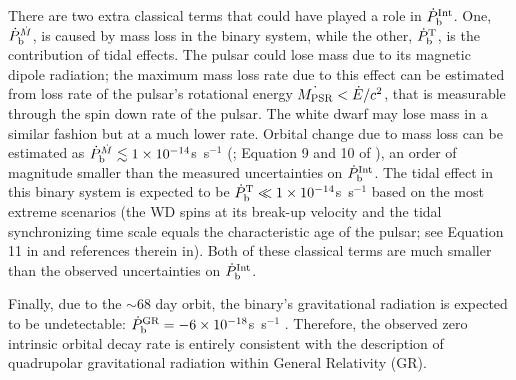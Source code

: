 There are two extra classical terms that could have played a role in
$\dot{P}_{\rm b}^{\rm Int}$. One, $\dot{P}_{\rm b}^{\dot{M}}$, is caused by mass loss in the
binary system, while the other, $\dot{P}_{\rm b}^{\rm T}$, is the contribution of tidal effects.
The pulsar could lose mass due to its magnetic dipole radiation; the maximum
mass loss rate due to this effect can be estimated from loss rate of the
pulsar's rotational energy $\dot{M_{\rm PSR}}<\dot{E}/c^2$, that is
measurable through the spin down rate of the pulsar.
The white dwarf may lose mass in a similar fashion but at a much lower rate.
Orbital change due to mass loss can be estimated as $\dot{P}_{\rm
b}^{\dot{M}}\lesssim 1\times10^{-14}$s~s$^{-1}$ (\citealt{dt91}; Equation 9 and 10
of \citealt{fwe+12}), an order of magnitude smaller than the measured
uncertainties on $\dot{P}_{\rm b}^{\rm Int}$.
The tidal effect in this binary system is expected to be $\dot{P}_{\rm b}^{\rm
T}\ll1\times10^{-14}$s~s$^{-1}$ based on the most extreme scenarios (the WD spins at its break-up velocity and the tidal synchronizing time scale equals the
characteristic age of the pulsar; see Equation 11 in \citealt{fwe+12} and
references therein in).
Both of these classical terms are much smaller than the observed uncertainties
on $\dot{P}_{\rm b}^{\rm Int}$.


Finally, due to the $\sim$68 day orbit, the binary's gravitational
radiation is expected to be undetectable: $\dot{P}_{\rm b}^{\rm GR} =
-6\times10^{-18}$s~s$^{-1}$ \citep{lk05}.  Therefore, the observed
zero intrinsic orbital decay rate is entirely consistent with the
description of quadrupolar gravitational radiation within General
Relativity (GR).


